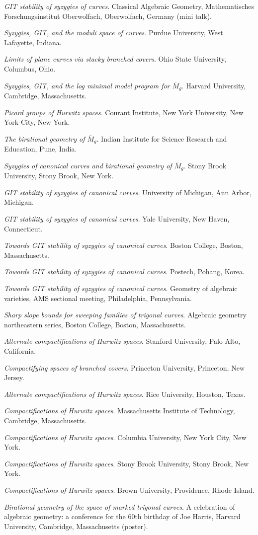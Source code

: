 \documentclass[11pt]{article}
\begin{document}
\begin{description}
\emph{GIT stability of syzygies of curves}.
Classical Algebraic Geometry, Mathematisches Forschungsinstitut Oberwolfach, Oberwolfach, Germany (mini talk).

\emph{Syzygies, GIT, and the moduli space of curves}.
Purdue University, West Lafayette, Indiana.

\emph{Limits of plane curves via stacky branched covers}.
Ohio State University, Columbus, Ohio.

\emph{Syzygies, GIT, and the log minimal model program for \(\overline{M}_g\)}.
Harvard University, Cambridge, Massachusetts.

\emph{Picard groups of Hurwitz spaces}.
Courant Institute, New York University, New York City, New York.

\emph{The birational geometry of \(\overline M_g\)}.
Indian Institute for Science Research and Education, Pune, India.

\emph{Syzygies of canonical curves and birational geometry of \(\overline M_g\)}.
Stony Brook University, Stony Brook, New York.
\item[{2014}] \emph{GIT stability of syzygies of canonical curves}.
University of Michigan, Ann Arbor, Michigan.

\emph{GIT stability of syzygies of canonical curves}.
Yale University, New Haven, Connecticut.

\emph{Towards GIT stability of syzygies of canonical curves}.
Boston College, Boston, Massachusetts.
\item[{2013}] \emph{Towards GIT stability of syzygies of canonical curves}.
Postech, Pohang, Korea.

\emph{Towards GIT stability of syzygies of canonical curves}.
Geometry of algebraic varieties, AMS sectional meeting, Philadelphia, Pennsylvania.

\emph{Sharp slope bounds for sweeping families of trigonal curves}.
Algebraic geometry northeastern series, Boston College, Boston, Massachusetts.

\emph{Alternate compactifications of Hurwitz spaces}.
Stanford University, Palo Alto, California.

\emph{Compactifying spaces of branched covers}.
Princeton University, Princeton, New Jersey.
\item[{2012}] \emph{Alternate compactifications of Hurwitz spaces}.
Rice University, Houston, Texas.
\item[{2011}] \emph{Compactifications of Hurwitz spaces}.
Massachusetts Institute of Technology, Cambridge, Massachusetts.

\emph{Compactifications of Hurwitz spaces}.
Columbia University, New York City, New York.

\emph{Compactifications of Hurwitz spaces}.
Stony Brook University, Stony Brook, New York.

\emph{Compactifications of Hurwitz spaces}.
Brown University, Providence, Rhode Island.

\emph{Birational geometry of the space of marked trigonal curves}.
A celebration of algebraic geometry: a conference for the 60th birthday of Joe Harris, Harvard University, Cambridge, Massachusetts (poster).
\end{description}
\end{document}

